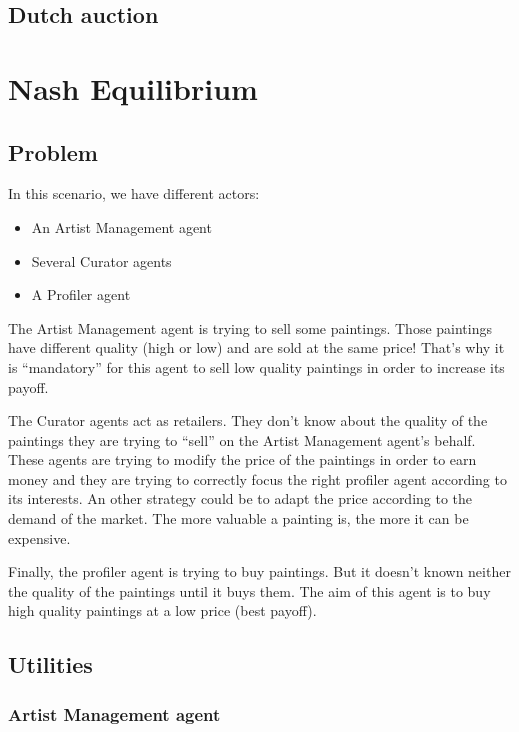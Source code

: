 \documentclass[a4paper,11pt]{article}
\begin{document}
  \subsection{Dutch auction}


  \section{Nash Equilibrium}
  
  \subsection{Problem}

  In this scenario, we have different actors:
  \begin{itemize}
   \item An Artist Management agent
   \item Several Curator agents
   \item A Profiler agent
  \end{itemize}
  
  The Artist Management agent is trying to sell some paintings. Those paintings have 
  different quality (high or low) and are sold at the same price! That's why it is 
  ``mandatory'' for this agent to sell low quality paintings in order to increase its 
  payoff.
  
  The Curator agents act as retailers. They don't know about the quality of the paintings 
  they are trying to ``sell'' on the Artist Management agent's behalf. These agents are 
  trying to modify the price of the paintings in order to earn money and they are trying to 
  correctly focus the right profiler agent according to its interests. An other strategy could 
  be to adapt the price according to the demand of the market. The more valuable a painting is, 
  the more it can be expensive.
  
  Finally, the profiler agent is trying to buy paintings. But it doesn't known neither the 
  quality of the paintings until it buys them. The aim of this agent is to buy high quality 
  paintings at a low price (best payoff).

  \subsection{Utilities}

  \subsubsection{Artist Management agent}
  
\end{document}
